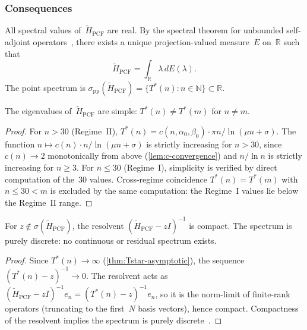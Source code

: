 \subsubsection{Consequences}

\begin{Corollary}\label{cor:spectral-thm}
All spectral values of~$\tilde{H}_{\mathrm{PCF}}$ are real.  By the
spectral theorem for unbounded self-adjoint operators~\cite{REED1972249},
there exists a unique projection-valued measure~$E$ on~$\mathbb{R}$
such that
\[
  \tilde{H}_{\mathrm{PCF}} = \int_{\mathbb{R}} \lambda\,dE(\lambda).
\]
The point spectrum is
$\sigma_{\mathrm{pp}}(\tilde{H}_{\mathrm{PCF}})
  = \{T^*(n) : n\in\mathbb{N}\} \subset \mathbb{R}$.
\end{Corollary}

\begin{Proposition}\label{prop:simple-eigenvalues}
The eigenvalues of~$\tilde{H}_{\mathrm{PCF}}$ are simple:
$T^*(n)\neq T^*(m)$ for $n\neq m$.
\end{Proposition}

\begin{proof}
For $n > 30$ (Regime~II), $T^*(n) = c(n,\alpha_0,\beta_0)\cdot
\pi n/\ln(\mu n + \sigma)$.  The function
$n\mapsto c(n)\cdot n/\ln(\mu n+\sigma)$ is strictly increasing for
$n>30$, since $c(n)\to 2$ monotonically from above
(\cref{lem:c-convergence}) and $n/\ln n$ is strictly increasing
for $n\ge 3$.  For $n\le 30$ (Regime~I), simplicity is verified by
direct computation of the~$30$ values.  Cross-regime coincidence
$T^*(n) = T^*(m)$ with $n\le 30 < m$ is excluded by the same
computation: the Regime~I values lie below the Regime~II range.
\end{proof}

\begin{Proposition}\label{prop:compact-resolvent}
For $z\notin\sigma(\tilde{H}_{\mathrm{PCF}})$, the resolvent
$(\tilde{H}_{\mathrm{PCF}} - zI)^{-1}$ is compact.
The spectrum is purely discrete: no continuous or residual spectrum
exists.
\end{Proposition}

\begin{proof}
Since $T^*(n)\to\infty$ (\cref{thm:Tstar-asymptotic}),
the sequence $(T^*(n)-z)^{-1}\to 0$.  The resolvent acts as
$(\tilde{H}_{\mathrm{PCF}}-zI)^{-1}e_n = (T^*(n)-z)^{-1}e_n$,
so it is the norm-limit of finite-rank operators (truncating
to the first~$N$ basis vectors), hence compact.  Compactness
of the resolvent implies the spectrum is purely
discrete~\cite{REED1972249}.
\end{proof}

